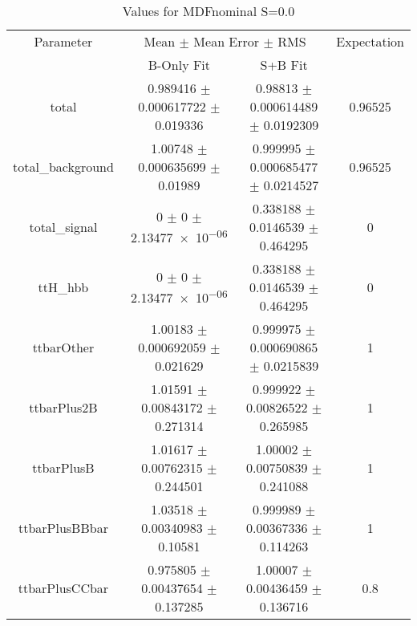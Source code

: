 \begin{table}
\centering
\caption{Values for MDFnominal S=0.0}
\begin{tabular}{cccc}
\toprule
Parameter & \multicolumn{2}{c}{Mean $\pm$ Mean Error $\pm$ RMS} & Expectation\\
 & B-Only Fit & S+B Fit & \\
\midrule
total & \num{0.989416} $\pm$ \num{0.000617722} $\pm$ \num{0.019336} & \num{0.98813} $\pm$ \num{0.000614489} $\pm$ \num{0.0192309} & \num{0.96525}\\
total\_background & \num{1.00748} $\pm$ \num{0.000635699} $\pm$ \num{0.01989} & \num{0.999995} $\pm$ \num{0.000685477} $\pm$ \num{0.0214527} & \num{0.96525}\\
total\_signal & \num{0} $\pm$ \num{0} $\pm$ \num{2.13477e-06} & \num{0.338188} $\pm$ \num{0.0146539} $\pm$ \num{0.464295} & \num{0}\\
ttH\_hbb & \num{0} $\pm$ \num{0} $\pm$ \num{2.13477e-06} & \num{0.338188} $\pm$ \num{0.0146539} $\pm$ \num{0.464295} & \num{0}\\
ttbarOther & \num{1.00183} $\pm$ \num{0.000692059} $\pm$ \num{0.021629} & \num{0.999975} $\pm$ \num{0.000690865} $\pm$ \num{0.0215839} & \num{1}\\
ttbarPlus2B & \num{1.01591} $\pm$ \num{0.00843172} $\pm$ \num{0.271314} & \num{0.999922} $\pm$ \num{0.00826522} $\pm$ \num{0.265985} & \num{1}\\
ttbarPlusB & \num{1.01617} $\pm$ \num{0.00762315} $\pm$ \num{0.244501} & \num{1.00002} $\pm$ \num{0.00750839} $\pm$ \num{0.241088} & \num{1}\\
ttbarPlusBBbar & \num{1.03518} $\pm$ \num{0.00340983} $\pm$ \num{0.10581} & \num{0.999989} $\pm$ \num{0.00367336} $\pm$ \num{0.114263} & \num{1}\\
ttbarPlusCCbar & \num{0.975805} $\pm$ \num{0.00437654} $\pm$ \num{0.137285} & \num{1.00007} $\pm$ \num{0.00436459} $\pm$ \num{0.136716} & \num{0.8}\\
\bottomrule
\end{tabular}
\end{table}